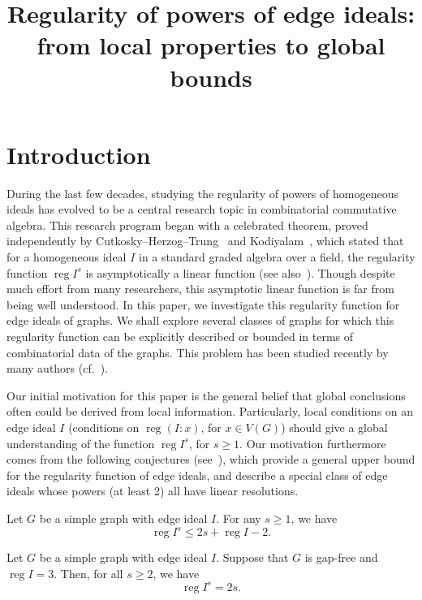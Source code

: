 \documentclass[ALCO,ThmDefs,Unicode,epreuves]{cedram}
\author[\initial{A.} Banerjee]{\firstname{Arindam} \lastname{Banerjee}}
\author[\initial{S.} \middlename{K.} Beyarslan]{\firstname{Selvi} \middlename{Kara} \lastname{Beyarslan}}
\author[\initial{H.} \middlename{T.} H{\`a}]{\firstname{Huy} \middlename{T{\`a}i} \lastname{H{\`a}}}
\title
[Regularity of powers of edge ideals: from local properties to global bounds]
{Regularity of powers of edge ideals: from local properties to global bounds}
\DeclareMathOperator{\reg}{reg}
\newcommand*{\reg}{\mathrm{reg}}
\begin{document}
\maketitle


\section{Introduction}

During the last few decades, studying the regularity of powers of homogeneous ideals has evolved to be a central research topic in combinatorial commutative algebra. This research program began with a celebrated theorem, proved independently by Cutkosky--Herzog--Trung~\cite{CHT} and Kodiyalam~\cite{Ko}, which stated that for a homogeneous ideal $I$ in a standard graded algebra over a field, the regularity function $\reg I^s$ is asymptotically a linear function (see also~\cite{BCH, TW}). Though despite much effort from many researchers, this asymptotic linear function is far from being well understood. In this paper, we investigate this regularity function for edge ideals of graphs. We shall explore several classes of graphs for which this regularity function can be explicitly described or bounded in terms of combinatorial data of the graphs. This problem has been studied recently by many authors (cf.~\cite{AB, ABS, Ba, BBH, BHT, Erey1, Erey2, JNS, JS, JS3, MFY, NFY}).


Our initial motivation for this paper is the general belief that global conclusions often could be derived from local information. Particularly, local conditions on an edge ideal $I$ (\ie conditions on $\reg (I:x)$, for $x \in V(G)$) should give a global understanding of the function $\reg I^s$, for $s \ge 1$. Our motivation furthermore comes from the following conjectures (see~\cite{BBH, Nevo, NP}), which provide a general upper bound for the regularity function of edge ideals, and describe a special class of edge ideals whose powers (at least 2) all have linear resolutions.


\begingroup
\def\thecdrthm{\Alph{cdrthm}}
\begin{conj}[Alilooee--Banerjee--Beyarslan--H{\`a}]
Let $G$ be a simple graph with edge ideal $I$. For any $s \ge 1$, we have
\[
\reg I^s \le 2s+\reg I - 2.
\]

\end{conj}


\begin{conj}
Let $G$ be a simple graph with edge ideal $I$. Suppose that $G$ is gap-free and $\reg I = 3$. Then, for all $s \ge 2$, we have
\[
\reg I^s = 2s.
\]

\end{conj}
\endgroup
\end{document}
